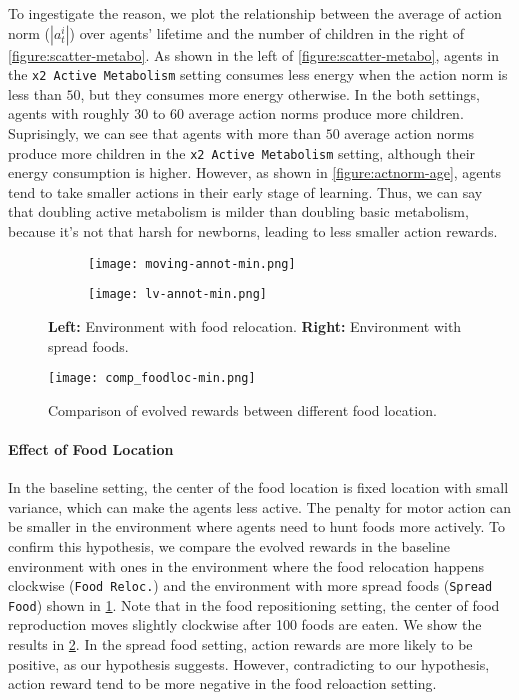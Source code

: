 To ingestigate the reason, we plot the relationship between the average of action norm ($|a_{t}^{i}|$) over agents' lifetime and the number of children in the right of \cref{figure:scatter-metabo}. As shown in the left of \cref{figure:scatter-metabo}, agents in the \texttt{x2 Active Metabolism} setting consumes less energy when the action norm is less than $50$, but they consumes more energy otherwise. In the both settings, agents with roughly $30$ to $60$ average action norms produce more children. Suprisingly, we can see that agents with more than $50$ average action norms produce more children in the \texttt{x2 Active Metabolism} setting, although their energy consumption is higher. However, as shown in \cref{figure:actnorm-age}, agents tend to take smaller actions in their early stage of learning. Thus, we can say that doubling active metabolism is milder than doubling basic metabolism, because it's not that harsh for newborns, leading to less smaller action rewards.

\begin{figure}[t]
  \begin{subfigure}[t]{4cm}
    \centering
    \texttt{[image: moving-annot-min.png]}
  \end{subfigure}
  \begin{subfigure}[t]{4cm}
    \centering
    \texttt{[image: lv-annot-min.png]}
  \end{subfigure}
  \caption{
    \textbf{Left:} Environment with food relocation.
    \textbf{Right:} Environment with spread foods.
  }\label{figure:foodloc}
\end{figure}

\begin{figure}[!htb]
  \centering
  \texttt{[image: comp\_foodloc-min.png]}
  \caption{
    Comparison of evolved rewards between different food location.
  }\label{figure:result-foodloc}
\end{figure}

\paragraph{Effect of Food Location}
In the baseline setting, the center of the food location is fixed location with small variance, which can make the agents less active. The penalty for motor action can be smaller in the environment where agents need to hunt foods more actively. To confirm this hypothesis, we compare the evolved rewards in the baseline environment with ones in the environment where the food relocation happens clockwise (\texttt{Food Reloc.}) and the environment with more spread foods (\texttt{Spread Food}) shown in \cref{figure:foodloc}. Note that in the food repositioning setting, the center of food reproduction moves slightly clockwise after 100 foods are eaten. We show the results in \cref{figure:result-foodloc}. In the spread food setting, action rewards are more likely to be positive, as our hypothesis suggests. However, contradicting to our hypothesis, action reward tend to be more negative in the food reloaction setting.

